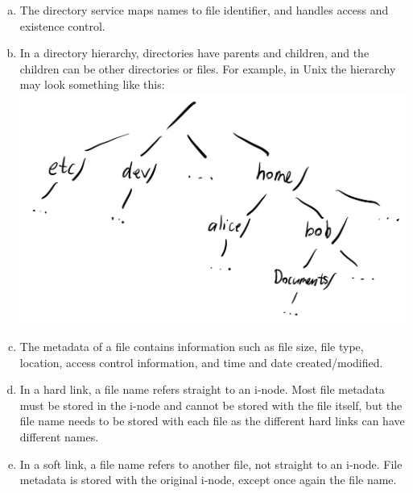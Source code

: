 \documentclass[12pt]{article}
\begin{document}
\begin{enumerate}[(a)]
    \item The directory service maps names to file identifier, and handles access and existence control.
    \item In a directory hierarchy, directories have parents and children, and the children can be other directories or files. For example, in Unix the hierarchy may look something like this:\\
    \includegraphics[scale=0.3]{3.4b.jpg}
    \item The metadata of a file contains information such as file size, file type, location, access control information, and time and date created/modified.
    \item In a hard link, a file name refers straight to an i-node. Most file metadata must be stored in the i-node and cannot be stored with the file itself, but the file name needs to be stored with each file as the different hard links can have different names.
    \item In a soft link, a file name refers to another file, not straight to an i-node. File metadata is stored with the original i-node, except once again the file name.
\end{enumerate}
\end{document}
